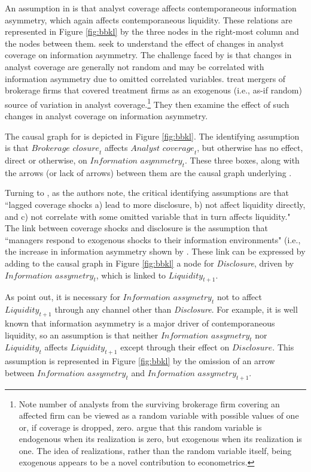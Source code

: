 \documentclass[11pt]{amsart}
\begin{document}
An assumption in \citet{Kelly:2012ih} is that analyst coverage affects contemporaneous information asymmetry, which again affects contemporaneous liquidity.
These relations are represented in Figure \ref{fig:bbkl} by the three nodes in the right-most column and the nodes between them.
\citet{Kelly:2012ih} seek to understand the effect of changes in analyst coverage on information asymmetry. 
The challenge faced by \citet{Kelly:2012ih} is that changes in analyst coverage are generally not random and may be correlated with information asymmetry due to omitted correlated variables.
\citet{Kelly:2012ih} treat mergers of brokerage firms that covered treatment firms as an exogenous (i.e., as-if random) source of variation in analyst coverage.\footnote{Note number of analysts from the surviving brokerage firm covering an affected firm can be viewed as a random variable with possible values of one or, if coverage is dropped, zero. \citet{Kelly:2012ih} argue that this random variable is endogenous when its realization is zero, but exogenous when its realization is one. 
The idea of realizations, rather than the random variable itself, being exogenous appears to be a novel contribution to econometrics.} 
They then examine the effect of such changes in analyst coverage on information asymmetry.

The causal graph for \citet{Kelly:2012ih} is depicted in Figure \ref{fig:bbkl}.
The identifying assumption is that $\textit{Brokerage closure}_t$ affects $\textit{Analyst coverage}_t$, but otherwise has no effect, direct or otherwise, on $\textit{Information asymmetry}_t$.
These three boxes, along with the arrows (or lack of arrows) between them are the causal graph underlying \citet{Kelly:2012ih}.

Turning to \citet{Balakrishnan:2014js}, as the authors note, the critical identifying assumptions are that ``lagged coverage shocks a) lead to more disclosure, b) not affect liquidity directly, and c) not correlate with some omitted variable that in turn affects liquidity." 
The link between coverage shocks and disclosure is the assumption that ``managers respond to exogenous shocks to their information environments" (i.e., the increase in information asymmetry shown by  \citet{Kelly:2012ih}.
These link can be expressed by adding to the causal graph in Figure \ref{fig:bbkl} a node for \textit{Disclosure}, driven by $\textit{Information assymetry}_t$, which is linked to $\textit{Liquidity}_{t+1}$.

As \citet{Balakrishnan:2014js} point out, it is necessary for $\textit{Information assymetry}_t$ not to affect $\textit{Liquidity}_{t+1}$ through any channel other than \textit{Disclosure}.
For example, it is well known that information asymmetry is a major driver of contemporaneous liquidity, so an assumption is that neither $\textit{Information assymetry}_t$ nor $\textit{Liquidity}_t$ affects $\textit{Liquidity}_{t+1}$ except through their effect on $\textit{Disclosure}$. 
This assumption is represented in Figure \ref{fig:bbkl} by the omission of an arrow between $\textit{Information assymetry}_t$ and $\textit{Information assymetry}_{t+1}$.
\end{document}
